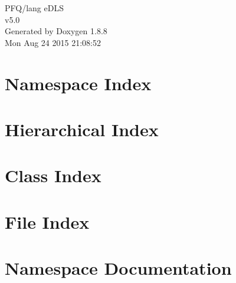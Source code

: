 \documentclass[twoside]{book}
\newcommand{\+}{\discretionary{\mbox{\scriptsize$\hookleftarrow$}}{}{}}
\newcommand{\clearemptydoublepage}{%
  \newpage{\pagestyle{empty}\cleardoublepage}%
}
\begin{document}
\hypersetup{pageanchor=false,
             bookmarks=true,
             bookmarksnumbered=true,
             pdfencoding=unicode
            }
\begin{titlepage}
\vspace*{7cm}
\begin{center}%
{\Large P\+F\+Q/lang e\+D\+L\+S \\[1ex]\large v5.\+0 }\\
\vspace*{1cm}
{\large Generated by Doxygen 1.8.8}\\
\vspace*{0.5cm}
{\small Mon Aug 24 2015 21:08:52}\\
\end{center}
\end{titlepage}
\clearemptydoublepage
\tableofcontents
\clearemptydoublepage
{}
\hypersetup{pageanchor=true}

\chapter{Namespace Index}

\chapter{Hierarchical Index}

\chapter{Class Index}

\chapter{File Index}

\chapter{Namespace Documentation}





\end{document}
